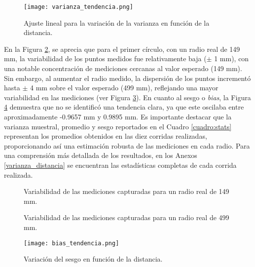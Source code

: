 \begin{figure}[H]
	\centering
	\texttt{[image: varianza\_tendencia.png]}
	\caption{Ajuste lineal para la variación de la varianza en función de la distancia.}
	\label{fig:varianza_tendencia}
\end{figure}

En la Figura \ref{fig:lecturas1}, se aprecia que para el primer círculo, con un radio real de 149 mm, la variabilidad de los puntos medidos fue relativamente baja ($\pm$ 1 mm), con una notable concentración de mediciones cercanas al valor esperado (149 mm). Sin embargo, al aumentar el radio medido, la dispersión de los puntos incrementó hasta $\pm$ 4 mm sobre el valor esperado (499 mm), reflejando una mayor variabilidad en las mediciones (ver Figura \ref{fig:lecturas8}). En cuanto al sesgo o \textit{bias}, la Figura \ref{fig:bias_tendencia} demuestra que no se identificó una tendencia clara, ya que este oscilaba entre aproximadamente -0.9657 mm y 0.9895 mm. Es importante destacar que la varianza muestral, promedio y sesgo reportados en el Cuadro \ref{cuadro:stats} representan los promedios obtenidos en las diez corridas realizadas, proporcionando así una estimación robusta de las mediciones en cada radio. Para una comprensión más detallada de los resultados, en los Anexos \ref{varianza_distancia} se encuentran las estadísticas completas de cada corrida realizada.


\begin{figure}[H]
	\centering
	\caption{Variabilidad de las mediciones capturadas para un radio real de 149 mm.}
	\label{fig:lecturas1}
\end{figure}

\begin{figure}[H]
	\centering
	\caption{Variabilidad de las mediciones capturadas para un radio real de 499 mm.}
	\label{fig:lecturas8}
\end{figure}

\begin{figure}[H]
	\centering
	\texttt{[image: bias\_tendencia.png]}
	\caption{Variación del sesgo en función de la distancia.}
	\label{fig:bias_tendencia}
\end{figure}

